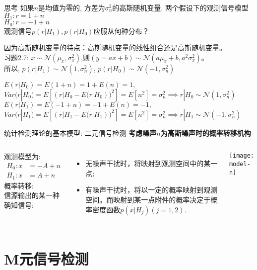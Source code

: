 \begin{frame}[shrink]
\begin{block}{思考}
	如果$n$是均值为零的, 方差为$\sigma_n^2$的高斯随机变量, 两个假设下的观测信号模型\\
	$H_1: r=1+n$\\
	$H_0: r=-1+n$\\
	观测信号$p(r|H_1),p(r|H_0)$应服从何种分布？
\end{block}
\begin{block}{}
	因为高斯随机变量的特点：高斯随机变量的线性组合还是高斯随机变量。\\
	习题2.7: $x\sim\mathcal{N}(\mu_x,\sigma_x^2)$,则$(y=ax+b)\sim\mathcal{N}(a\mu_x+b,a^2\sigma_x^2)$。\\
	所以, $p(r|H_1)\sim\mathcal{N}(1,\sigma_n^2)$, $p(r|H_0)\sim\mathcal{N}(-1,\sigma_n^2)$
\end{block}
\begin{block}{}
	$E(r|H_0)=E(1+n)=1+E(n)=1,$\\
	$Var(r|H_0)=E[(r|H_0-E(r|H_0))^2]=E[n^2]=\sigma_n^2\implies r|H_0\sim\mathcal{N}(1,\sigma_n^2)$\\
	$E(r|H_1)=E(-1+n)=-1+E(n)=-1,$\\
	$Var(r|H_1)=E[(r|H_1-E(r|H_1))^2]=E[n^2]=\sigma_n^2\implies r|H_1\sim\mathcal{N}(-1,\sigma_n^2)$
\end{block}
\end{frame}

\begin{frame}{统计检测理论的基本模型: 二元信号检测}
\textbf{考虑噪声$n$为高斯噪声时的概率转移机构}
\begin{columns}
	观测模型为:
	\begin{align*}
	H_0: x&=-A+n\\
	H_1: x&=A+n
	\end{align*}
	概率转移:\\
	信源输出的某一种确知信号:
	\begin{itemize}
		\item 无噪声干扰时，将映射到观测空间中的某一点;
		\item 有噪声干扰时，将以一定的概率映射到观测空间。而映射到某一点附件的概率决定于概率密度函数$p(x|H_j)(j=1,2)$.
	\end{itemize}
	\texttt{[image: model-n]}
\end{columns}
\end{frame}

\section{M元信号检测}


